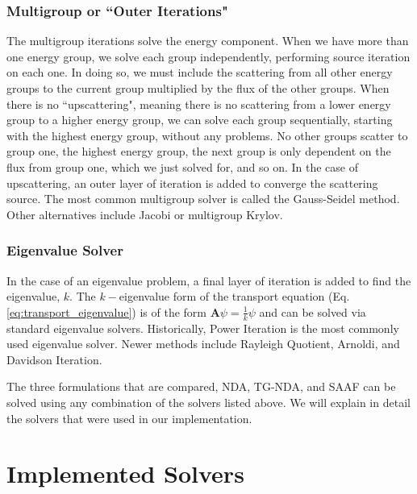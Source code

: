 \subsubsection{Multigroup or ``Outer Iterations"}
The multigroup iterations solve the energy component. When we have more than one energy group, we solve each group independently, performing source iteration on each one. In doing so, we must include the scattering from all other energy groups to the current group multiplied by the flux of the other groups. When there is no ``upscattering", meaning there is no scattering from a lower energy group to a higher energy group, we can solve each group sequentially, starting with the highest energy group, without any problems. No other groups scatter to group one, the highest energy group, the next group is only dependent on the flux from group one, which we just solved for, and so on. In the case of upscattering, an outer layer of iteration is added to converge the scattering source. The most common multigroup solver is called the Gauss-Seidel method. Other alternatives include Jacobi or multigroup Krylov. 

\subsubsection{Eigenvalue Solver}
In the case of an eigenvalue problem, a final layer of iteration is added to find the eigenvalue, $k$. The $k-$eigenvalue form of the transport equation (Eq. \ref{eq:transport_eigenvalue}) is of the form $\textbf{A}\psi = \frac{1}{k}\psi$ and can be solved via standard eigenvalue solvers. Historically, Power Iteration is the most commonly used eigenvalue solver. Newer methods include Rayleigh Quotient, Arnoldi, and Davidson Iteration. 

The three formulations that are compared, NDA, TG-NDA, and SAAF can be solved using any combination of the solvers listed above. We will explain in detail the solvers that were used in our implementation. 
\section{Implemented Solvers}
